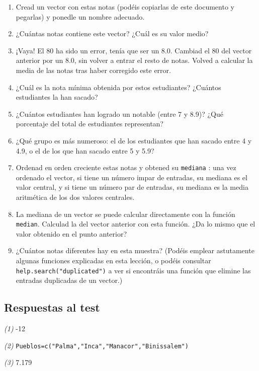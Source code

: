 \documentclass[
]{book}
\providecommand{\tightlist}{%
  \setlength{\itemsep}{0pt}\setlength{\parskip}{0pt}}
\theoremstyle{definition}
\theoremstyle{definition}
\theoremstyle{definition}
\theoremstyle{remark}
\begin{document}
\begin{enumerate}
\def\labelenumi{\arabic{enumi}.}
\tightlist
\item
  Cread un vector con estas notas (podéis copiarlas de este documento y pegarlas) y ponedle un nombre adecuado.
\item
  ¿Cuántas notas contiene este vector? ¿Cuál es su valor medio?
\item
  ¡Vaya! El 80 ha sido un error, tenía que ser un 8.0. Cambiad el 80 del vector anterior por un 8.0, sin volver a entrar el resto de notas. Volved a calcular la media de las notas tras haber corregido este error.
\item
  ¿Cuál es la nota mínima obtenida por estos estudiantes? ¿Cuántos estudiantes la han sacado?
\item
  ¿Cuántos estudiantes han logrado un notable (entre 7 y 8.9)? ¿Qué porcentaje del total de estudiantes representan?
\item
  ¿Qué grupo es más numeroso: el de los estudiantes que han sacado entre 4 y 4.9, o el de los que han sacado entre 5 y 5.9?
\item
  Ordenad en orden creciente estas notas y obtened su \texttt{mediana} : una vez ordenado el vector, si tiene un número impar de entradas, su mediana es el valor central, y si tiene un número par de entradas, su mediana es la media aritmética de los dos valores centrales.
\item
  La mediana de un vector se puede calcular directamente con la función \texttt{median}.
  Calculad la del vector anterior con esta función.
  ¿Da lo mismo que el valor obtenido en el punto anterior?
\item
  ¿Cuántos notas diferentes hay en esta muestra? (Podéis emplear astutamente algunas funciones explicadas en esta lección, o podéis consultar \texttt{help.search("duplicated")} a ver si encontráis una función que elimine las entradas duplicadas de un vector.)
\end{enumerate}

\hypertarget{respuestas-al-test-1}{%
\subsection*{Respuestas al test}\label{respuestas-al-test-1}}

\emph{(1)} -12

\emph{(2)} \texttt{Pueblos=c("Palma","Inca","Manacor","Binissalem")}

\emph{(3)} 7.179
\end{document}

